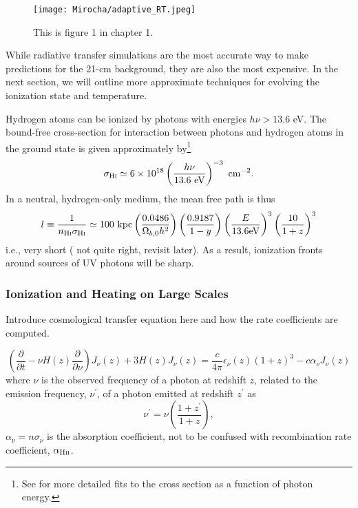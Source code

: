 \begin{figure}[]
\begin{center}
\texttt{[image: Mirocha/adaptive\_RT.jpeg]}
\end{center}
\caption{This is figure 1 in chapter 1.}
\end{figure}


While radiative transfer simulations are the most accurate way to make predictions for the 21-cm background, they are also the most expensive. In the next section, we will outline more approximate techniques for evolving the ionization state and temperature.


Hydrogen atoms can be ionized by photons with energies $h\nu > 13.6$ eV. The bound-free cross-section for interaction between photons and hydrogen atoms in the ground state is given approximately by\footnote{See \cite{Verner1996} for more detailed fits to the cross section as a function of photon energy.}
\begin{equation}
	\sigma_{\text{H} {\textsc{i}}} \simeq 6 \times 10^{18} \left(\frac{h\nu}{13.6 \ \mathrm{eV}} \right)^{-3} \ \mathrm{cm}^{-2} . \label{eq:xsec}
\end{equation}	
In a neutral, hydrogen-only medium, the mean free path is thus
\begin{equation}
	l \equiv \frac{1}{n_{\text{H} {\textsc{i}}} \sigma_{\text{H} {\textsc{i}}}} \simeq 100 \ \mathrm{kpc} \left( \frac{0.0486}{\Omega_{b,0} h^2} \right) \left(\frac{0.9187}{1-y}\right) \left( \frac{E}{13.6 \mathrm{eV}} \right)^3 \left(\frac{10}{1+z} \right)^3 \label{eq:mfp}
\end{equation}
i.e., very short ({\color{red} not quite right, revisit later}). As a result, ionization fronts around sources of UV photons will be sharp. 


\subsubsection{Ionization and Heating on Large Scales} \label{sec:largescales}
Introduce cosmological transfer equation here and how the rate coefficients are computed.

\begin{equation}
    \left(\frac{\partial}{\partial t} - \nu H(z) \frac{\partial}{\partial \nu} \right) J_{\nu}(z) + 3 H(z) J_{\nu}(z) =  \frac{c}{4\pi} \epsilon_{\nu}(z) (1 + z)^3 - c \alpha_{\nu} J_{\nu}(z) \label{eq:rte_diffeq}
\end{equation}
where $\nu$ is the observed frequency of a photon at redshift $z$, related to the emission frequency, $\nu^{\prime}$, of a photon emitted at redshift $z^{\prime}$ as
\begin{equation}
    \nu^{\prime} = \nu \left(\frac{1 + z^{\prime}}{1 + z}\right) , \label{eq:EmissionFrequency}
\end{equation}
$\alpha_{\nu} = n \sigma_{\nu}$ is the absorption coefficient, not to be confused with recombination rate coefficient, $\alpha_{\text{H} {\textsc{ii}}}$.

